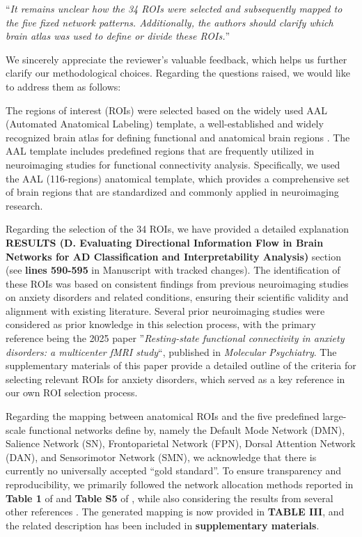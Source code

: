 \documentclass[12pt,technote,onecolumn]{IEEEtran}
\begin{document}
 ``{\it It remains unclear how the 34 ROIs were selected and subsequently mapped to the five fixed network patterns. Additionally, the authors should clarify which brain atlas was used to define or divide these ROIs.}''
\vspace{1mm}


We sincerely appreciate the reviewer’s valuable feedback, which helps us further clarify our methodological choices. Regarding the questions raised, we would like to address them as follows:

The regions of interest (ROIs) were selected based on the widely used AAL (Automated Anatomical Labeling) template, a well-established and widely recognized brain atlas for defining functional and anatomical brain regions \cite{tzourio2002automated}. The AAL template includes predefined regions that are frequently utilized in neuroimaging studies for functional connectivity analysis. Specifically, we used the AAL (116-regions) anatomical template, which provides a comprehensive set of brain regions that are standardized and commonly applied in neuroimaging research.

Regarding the selection of the 34 ROIs, we have provided a detailed explanation \textbf{RESULTS (D. Evaluating Directional Information Flow in Brain Networks for AD Classification and Interpretability Analysis)} section (see \textbf{lines 590-595} in Manuscript with tracked changes). The identification of these ROIs was based on consistent findings from previous neuroimaging studies on anxiety disorders and related conditions, ensuring their scientific validity and alignment with existing literature. Several prior neuroimaging studies were considered as prior knowledge in this selection process, with the primary reference being the 2025 paper ”\textit{Resting-state functional connectivity in anxiety disorders: a multicenter fMRI study}“, published in \textit{Molecular Psychiatry}\cite{langhammer2025resting}. The supplementary materials of this paper provide a detailed outline of the criteria for selecting relevant ROIs for anxiety disorders, which served as a key reference in our own ROI selection process.

Regarding the mapping between anatomical ROIs and the five predefined large-scale functional networks define by\cite{yeo2011organization}, namely the Default Mode Network (DMN), Salience Network (SN), Frontoparietal Network (FPN), Dorsal Attention Network (DAN), and Sensorimotor Network (SMN), we acknowledge that there is currently no universally accepted “gold standard”. To ensure transparency and reproducibility, we primarily followed the network allocation methods reported in \textbf{Table 1} of \cite{takagi2018common} and \textbf{Table S5} of \cite{sun2024brain}, while also considering the results from several other references
\cite{huang2022mapping,kuang2020default,passow2015default,pedersini2020functional,dixon2018heterogeneity,vossel2014dorsal,chenji2016investigating}. The generated mapping is now provided in \textbf{TABLE III}, and the related description has been included in \textbf{supplementary materials}.
\end{document}

